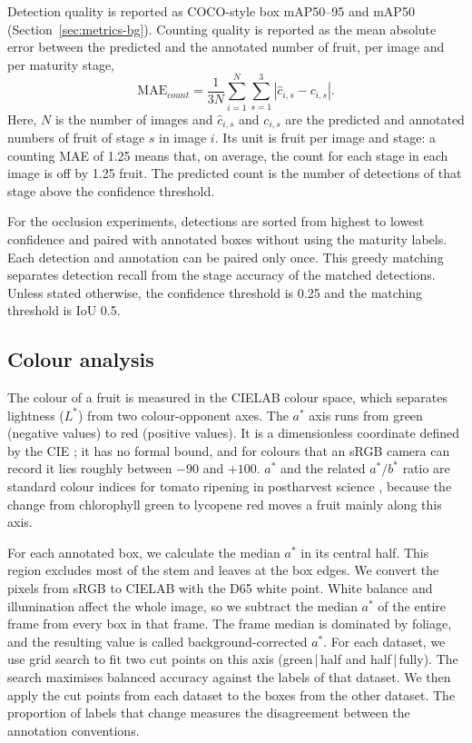 Detection quality is reported as COCO-style box mAP50--95 and mAP50
(Section~\ref{sec:metrics-bg}). Counting quality is reported as the mean
absolute error between the predicted and the annotated number of fruit, per
image and per maturity stage,
\begin{equation}
 \mathrm{MAE}_{count} = \frac{1}{3N}\sum_{i=1}^{N}\sum_{s=1}^{3}
 \left|\hat{c}_{i,s}-c_{i,s}\right|.
\end{equation}
Here, $N$ is the number of images and $\hat{c}_{i,s}$ and $c_{i,s}$ are the
predicted and annotated numbers of fruit of stage $s$ in image $i$. Its unit is
fruit per image and stage: a counting MAE of 1.25 means that, on average, the
count for each stage in each image is off by 1.25 fruit. The predicted count is
the number of detections of that stage above the confidence threshold.

For the occlusion experiments, detections are sorted from highest to lowest
confidence and paired with annotated boxes without using the maturity labels.
Each detection and annotation can be paired only once. This greedy matching
separates detection recall from the stage accuracy of the matched detections.
Unless stated otherwise, the confidence threshold is 0.25 and the matching
threshold is IoU 0.5.

\subsection{Colour analysis}
\label{sec:colour}

The colour of a fruit is measured in the CIELAB colour space, which separates
lightness ($L^*$) from two colour-opponent axes. The $a^*$ axis runs from green
(negative values) to red (positive values). It is a dimensionless coordinate
defined by the CIE \cite{cie2018colorimetry}; it has no formal bound, and for
colours that an sRGB camera can record it lies roughly between $-90$ and
$+100$. $a^*$ and the related $a^*/b^*$ ratio are standard colour indices for
tomato ripening in postharvest science \cite{lopezcamelo2004color}, because
the change from chlorophyll green to lycopene red moves a fruit mainly along
this axis.

For each annotated box, we calculate the median $a^*$ in its central half. This
region excludes most of the stem and leaves at the box edges. We convert the
pixels from sRGB to CIELAB with the D65 white point. White balance and
illumination affect the whole image, so we subtract the median $a^*$ of the
entire frame from every box in that frame. The frame median is dominated by
foliage, and the resulting value is called background-corrected $a^*$. For each
dataset, we use grid search to fit two cut points on this axis
(green\,|\,half and half\,|\,fully). The search maximises balanced accuracy
against the labels of that dataset. We then apply the cut points from each
dataset to the boxes from the other dataset. The proportion of labels that
change measures the disagreement between the annotation conventions.
